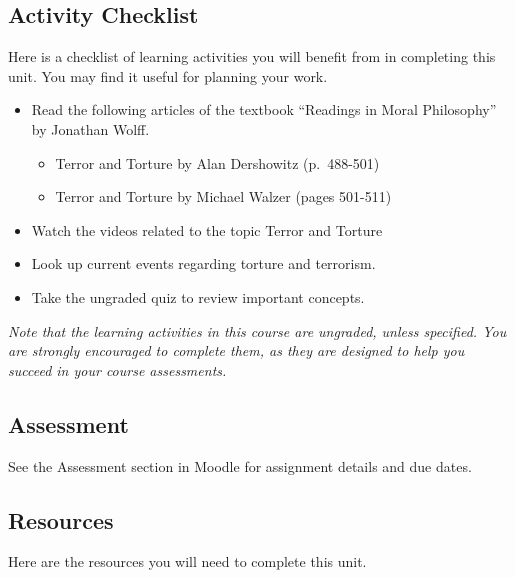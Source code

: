 \documentclass[
]{book}
\providecommand{\tightlist}{%
  \setlength{\itemsep}{0pt}\setlength{\parskip}{0pt}}
\begin{document}
\hypertarget{activity-checklist-5}{%
\subsection*{Activity Checklist}\label{activity-checklist-5}}

Here is a checklist of learning activities you will benefit from in completing this unit. You may find it useful for planning your work.

\begin{itemize}
\tightlist
\item
  Read the following articles of the textbook ``Readings in Moral Philosophy'' by Jonathan Wolff.

  \begin{itemize}
  \tightlist
  \item
    Terror and Torture by Alan Dershowitz (p.~488-501)
  \item
    Terror and Torture by Michael Walzer (pages 501-511)
  \end{itemize}
\item
  Watch the videos related to the topic Terror and Torture
\item
  Look up current events regarding torture and terrorism.
\item
  Take the ungraded quiz to review important concepts.
\end{itemize}

\emph{Note that the learning activities in this course are ungraded, unless specified. You are strongly encouraged to complete them, as they are designed to help you succeed in your course assessments.}

\hypertarget{assessment-10}{%
\subsection*{Assessment}\label{assessment-10}}

See the Assessment section in Moodle for assignment details and due dates.

\hypertarget{resources-5}{%
\subsection*{Resources}\label{resources-5}}

Here are the resources you will need to complete this unit.
\end{document}
